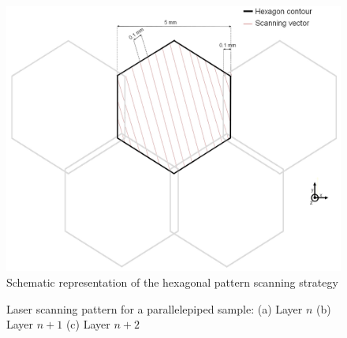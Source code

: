 \begin{figure}[ht]
\centering
\includegraphics[scale=0.27]{Images/OL}
\decoRule
\caption[Schematic representation of the hexagonal pattern scanning strategy]{Schematic representation of the hexagonal pattern scanning strategy}
\label{fig:OL}
\end{figure}

\begin{figure}[ht]
\centering
\noindent{}
\decoRule
\caption[Screen capture of the laser scanning pattern for a parallelepiped sample: (a) Layer $n$ (b) Layer $n+1$ (c) Layer $n+2$]{Laser scanning pattern for a parallelepiped sample: (a) Layer $n$ (b) Layer $n+1$ (c) Layer $n+2$}
\label{fig:Lassup}
\end{figure}

